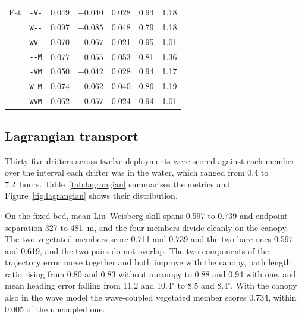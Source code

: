 \begin{table}[H]
\begin{tabular}{llrrrrr}
    Est      & \texttt{{-}V{-}}    & 0.049 & $+0.040$ & 0.028 & 0.94 & 1.18 \\
             & \texttt{W{-}{-}}    & 0.097 & $+0.085$ & 0.048 & 0.79 & 1.18 \\
             & \texttt{WV{-}}      & 0.070 & $+0.067$ & 0.021 & 0.95 & 1.01 \\
             & \texttt{{-}{-}M}    & 0.077 & $+0.055$ & 0.053 & 0.81 & 1.36 \\
             & \texttt{{-}VM}      & 0.050 & $+0.042$ & 0.028 & 0.94 & 1.17 \\
             & \texttt{W{-}M}      & 0.074 & $+0.062$ & 0.040 & 0.86 & 1.19 \\
             & \texttt{WVM}        & 0.062 & $+0.057$ & 0.024 & 0.94 & 1.01 \\
      \bottomrule
  \end{tabular}
\end{table}

\subsection{Lagrangian transport}
\label{sec:res_drifters}

Thirty-five drifters across twelve deployments were scored against each member
over the interval each drifter was in the water, which ranged from 0.4 to
7.2~hours. Table~\ref{tab:lagrangian} summarises the metrics and
Figure~\ref{fig:lagrangian} shows their distribution.

On the fixed bed, mean Liu--Weisberg skill spans 0.597 to 0.739 and endpoint
separation 327 to 481~m, and the four members divide cleanly on the canopy. The
two vegetated members score 0.711 and 0.739 and the two bare ones 0.597 and
0.619, and the two pairs do not overlap. The two components of the trajectory
error move together and both improve with the canopy, path length ratio rising
from 0.80 and 0.83 without a canopy to 0.88 and 0.94 with one, and mean heading
error falling from 11.2 and 10.4$^\circ$ to 8.5 and 8.4$^\circ$. With the
canopy also in the wave model the wave-coupled vegetated member scores 0.734,
within 0.005 of the uncoupled one.

